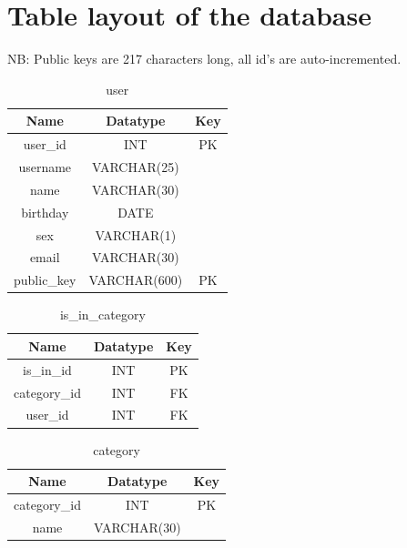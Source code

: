 \clearpage

\section{Table layout of the database}
NB: Public keys are 217 characters long, all id's are auto-incremented.

\begin{table}[!ht]
\caption{user}
\centering
\begin{tabular}{c c c}
\hline\hline
Name               & Datatype    & Key \\
\hline
user\_id           & INT          & PK \\  %
username           & VARCHAR(25)  &    \\
name               & VARCHAR(30)  &    \\
birthday           & DATE         &    \\
sex                & VARCHAR(1)   &    \\
email              & VARCHAR(30)  &    \\
public\_key        & VARCHAR(600)   & PK \\
\hline
\end{tabular}
\label{table:nonlin}
\end{table}

\begin{table}[!ht]
\caption{is\_in\_category}
\centering
\begin{tabular}{c c c}
\hline\hline
Name               & Datatype    & Key \\
\hline
is\_in\_id         & INT     & PK   \\
category\_id       & INT     & FK   \\
user\_id           & INT     & FK   \\
\hline
\end{tabular}
\label{table:nonlin}
\end{table}

\begin{table}[!ht]
\caption{category}
\centering
\begin{tabular}{c c c}
\hline\hline
Name               & Datatype    & Key \\
\hline
category\_id       & INT         & PK  \\
name               & VARCHAR(30) &     \\
\hline
\end{tabular}
\label{table:nonlin}
\end{table}


